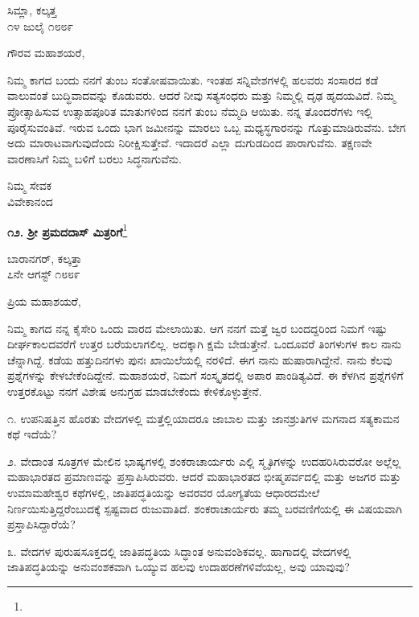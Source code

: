 \begin{flushright}
ಸಿಮ್ಲಾ, ಕಲ್ಕತ್ತ\\೧೪ ಜುಲೈ ೧೮೮೯
\end{flushright}

\noindent
ಗೌರವ ಮಹಾಶಯರೆ,

ನಿಮ್ಮ ಕಾಗದ ಬಂದು ನನಗೆ ತುಂಬ ಸಂತೋಷವಾಯಿತು. ಇಂತಹ ಸನ್ನಿವೇಶಗಳಲ್ಲಿ ಹಲವರು ಸಂಸಾರದ ಕಡೆ ವಾಲುವಂತೆ ಬುದ್ಧಿವಾದವನ್ನು ಕೊಡುವರು. ಆದರೆ ನೀವು ಸತ್ಯಸಂಧರು ಮತ್ತು ನಿಮ್ಮಲ್ಲಿ ದೃಢ ಹೃದಯವಿದೆ. ನಿಮ್ಮ ಪ್ರೋತ್ಸಾಹಿಸುವ ಉತ್ಸಾಹಪೂರಿತ ಮಾತುಗಳಿಂದ ನನಗೆ ತುಂಬ ನೆಮ್ಮದಿ ಆಯಿತು. ನನ್ನ ತೊಂದರೆಗಳು ಇಲ್ಲಿ ಪೂರೈಸುವಂತಿವೆ. ಇರುವ ಒಂದು ಭಾಗ ಜಮೀನನ್ನು ಮಾರಲು ಒಬ್ಬ ಮಧ್ಯಸ್ಥಗಾರನನ್ನು ಗೊತ್ತುಮಾಡಿರುವೆನು. ಬೇಗ ಅದು ಮಾರಾಟವಾಗುವುದೆಂದು ನಿರೀಕ್ಷಿಸುತ್ತೇವೆ. ಇದಾದರೆ ಎಲ್ಲಾ ದುಗುಡದಿಂದ ಪಾರಾಗುವೆನು. ತಕ್ಷಣವೇ ವಾರಣಾಸಿಗೆ ನಿಮ್ಮ ಬಳಿಗೆ ಬರಲು ಸಿದ್ಧನಾಗುವೆನು.

{\flushright
ನಿಮ್ಮ ಸೇವಕ\\ವಿವೇಕಾನಂದ\par}
\vfill 
\eject

\begin{center}
\textbf{೧೨. ಶ‍್ರೀ ಪ್ರಮದದಾಸ್ ಮಿತ್ರರಿಗೆ}\footnote{}
\end{center}

\begin{flushright}
ಬಾರಾನಗರ್, ಕಲ್ಕತ್ತಾ\\೭ನೇ ಆಗಸ್ಟ್ ೧೮೮೯
\end{flushright}

\noindent
ಪ್ರಿಯ ಮಹಾಶಯರೆ,

ನಿಮ್ಮ ಕಾಗದ ನನ್ನ ಕೈಸೇರಿ ಒಂದು ವಾರದ ಮೇಲಾಯಿತು. ಆಗ ನನಗೆ ಮತ್ತೆ ಜ್ವರ ಬಂದದ್ದರಿಂದ ನಿಮಗೆ ಇಷ್ಟು ದೀರ್ಘಕಾಲದವರೆಗೆ ಉತ್ತರ ಬರೆಯಲಾಗಲಿಲ್ಲ. ಅದಕ್ಕಾಗಿ ಕ್ಷಮೆ ಬೇಡುತ್ತೇನೆ. ಒಂದೂವರೆ ತಿಂಗಳುಗಳ ಕಾಲ ನಾನು ಚೆನ್ನಾಗಿದ್ದೆ. ಕಡೆಯ ಹತ್ತುದಿನಗಳು ಪುನಃ ಖಾಯಿಲೆಯಲ್ಲಿ ನರಳಿದೆ. ಈಗ ನಾನು ಹುಷಾರಾಗಿದ್ದೇನೆ. ನಾನು ಕೆಲವು ಪ್ರಶ್ನೆಗಳನ್ನು ಕೇಳಬೇಕೆಂದಿದ್ದೇನೆ. ಮಹಾಶಯರೆ, ನಿಮಗೆ ಸಂಸ್ಕೃತದಲ್ಲಿ ಅಪಾರ ಪಾಂಡಿತ್ಯವಿದೆ. ಈ ಕೆಳಗಿನ ಪ್ರಶ್ನೆಗಳಿಗೆ ಉತ್ತರಕೊಟ್ಟು ನನಗೆ ವಿಶೇಷ ಅನುಗ್ರಹ ಮಾಡಬೇಕೆಂದು ಕೇಳಿಕೊಳ್ಳುತ್ತೇನೆ.

೧. ಉಪನಿಷತ್ತಿನ ಹೊರತು ವೇದಗಳಲ್ಲಿ ಮತ್ತೆಲ್ಲಿಯಾದರೂ ಜಾಬಾಲ ಮತ್ತು ಜಾನಶ್ರುತಿಗಳ ಮಗನಾದ ಸತ್ಯಕಾಮನ ಕಥೆ ಇದೆಯೆ?

೨. ವೇದಾಂತ ಸೂತ್ರಗಳ ಮೇಲಿನ ಭಾಷ್ಯಗಳಲ್ಲಿ ಶಂಕರಾಚಾರ್ಯರು ಎಲ್ಲಿ ಸ್ಮೃತಿಗಳನ್ನು ಉದಹರಿಸಿರುವರೋ ಅಲ್ಲೆಲ್ಲ ಮಹಾಭಾರತದ ಪ್ರಮಾಣವನ್ನು ಪ್ರಸ್ತಾಪಿಸಿರುವರು. ಆದರೆ ಮಹಾಭಾರತದ ಭೀಷ್ಮಪರ್ವದಲ್ಲಿ ಮತ್ತು ಅಜಗರ ಮತ್ತು ಉಮಾಮಹೇಶ್ವರ ಕಥೆಗಳಲ್ಲಿ, ಜಾತಿಪದ್ಧತಿಯನ್ನು ಅವರವರ ಯೋಗ್ಯತೆಯ ಆಧಾರದಮೇಲೆ ನಿರ್ಣಯಿಸುತ್ತಿದ್ದರೆಂಬುದಕ್ಕೆ ಸ್ಪಷ್ಟವಾದ ರುಜುವಾತಿದೆ. ಶಂಕರಾಚಾರ್ಯರು ತಮ್ಮ ಬರವಣಿಗೆಯಲ್ಲಿ ಈ ವಿಷಯವಾಗಿ ಪ್ರಸ್ತಾಪಿಸಿದ್ದಾರೆಯೆ?

೩. ವೇದಗಳ ಪುರುಷಸೂಕ್ತದಲ್ಲಿ ಜಾತಿಪದ್ಧತಿಯ ಸಿದ್ಧಾಂತ ಅನುವಂಶಿಕವಲ್ಲ. ಹಾಗಾದಲ್ಲಿ ವೇದಗಳಲ್ಲಿ ಜಾತಿಪದ್ಧತಿಯನ್ನು ಅನುವಂಶಕವಾಗಿ ಒಯ್ಯುವ ಹಲವು ಉದಾಹರಣೆಗಳಿವೆಯಲ್ಲ, ಅವು ಯಾವುವು?

